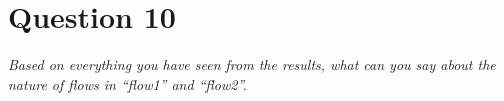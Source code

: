\section*{Question 10}
\textit{Based on everything you have seen from the results, what can you say about the nature of flows in “flow1” and “flow2”.}